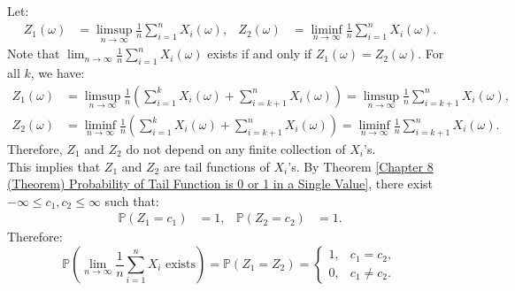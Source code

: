 \documentclass{huhtakm-template-book-v2}
\newcommand{\prob}{\mathbb{P}}
\begin{document}
    \begin{proofing}
        Let:
        \begin{align*}
            Z_{1}(\omega) &= \limsup_{n \to \infty}\frac{1}{n}\sum_{i = 1}^{n}X_{i}(\omega), & Z_{2}(\omega) &= \liminf_{n \to \infty}\frac{1}{n}\sum_{i = 1}^{n}X_{i}(\omega).
        \end{align*}
        Note that $\lim_{n \to \infty}\frac{1}{n}\sum_{i = 1}^{n}X_{i}(\omega)$ exists if and only if $Z_{1}(\omega) = Z_{2}(\omega)$. For all $k$, we have:
        \begin{align*}
            Z_{1}(\omega) &= \limsup_{n \to \infty}\frac{1}{n}\left(\sum_{i = 1}^{k}X_{i}(\omega)+\sum_{i = k+1}^{n}X_{i}(\omega)\right) = \limsup_{n \to \infty}\frac{1}{n}\sum_{i = k+1}^{n}X_{i}(\omega),\\
            Z_{2}(\omega) &= \liminf_{n \to \infty}\frac{1}{n}\left(\sum_{i = 1}^{k}X_{i}(\omega)+\sum_{i = k+1}^{n}X_{i}(\omega)\right) = \liminf_{n \to \infty}\frac{1}{n}\sum_{i = k+1}^{n}X_{i}(\omega).
        \end{align*}
        Therefore, $Z_{1}$ and $Z_{2}$ do not depend on any finite collection of $X_{i}$'s.\\
        This implies that $Z_{1}$ and $Z_{2}$ are tail functions of $X_{i}$'s. By Theorem \ref{Chapter 8 (Theorem) Probability of Tail Function is 0 or 1 in a Single Value}, there exist $-\infty \leq c_{1},c_{2} \leq \infty$ such that:
        \begin{align*}
            \prob(Z_{1} = c_{1}) &= 1, & \prob(Z_{2} = c_{2}) &= 1.
        \end{align*}
        Therefore:
        \begin{equation*}
            \prob\left(\lim_{n \to \infty}\frac{1}{n}\sum_{i = 1}^{n}X_{i}\text{ exists}\right) = \prob(Z_{1} = Z_{2}) = \begin{cases}
                1, & c_{1} = c_{2},\\
                0, & c_{1} \neq c_{2}.
            \end{cases}
        \end{equation*}
    \end{proofing}
    \newpage
\end{document}
